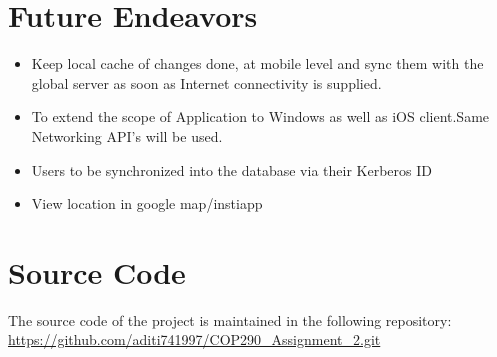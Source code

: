 \documentclass{article}
\begin{document}
	\section{Future Endeavors} 
		\begin{itemize} 
			\item Keep local cache of changes done, at mobile level and sync them with the global server as soon as Internet connectivity is supplied.
			\item To extend the scope of Application to Windows as well as iOS client.Same Networking API's will be used.
			\item Users to be synchronized into the database via their Kerberos ID
			\item View location in google map/instiapp
		\end{itemize}   
	\section{Source Code}
	The source code of the project is maintained in the following repository: \\
	\url{https://github.com/aditi741997/COP290_Assignment_2.git}
	
	\medskip
	
\end{document}
